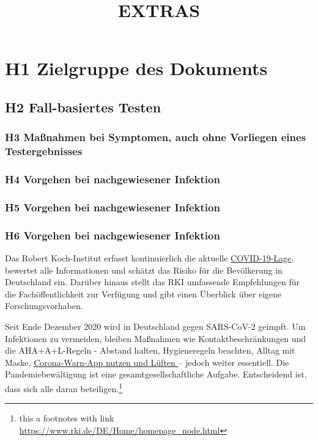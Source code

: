 \documentclass{article}
\begin{document}
\title{EXTRAS}

\maketitle


\section{H1 Zielgruppe des Dokuments}\label{H1720422}



\subsection{H2 Fall-basiertes Testen}\label{H2716720}



\subsubsection{H3 Maßnahmen bei Symptomen, auch ohne Vorliegen eines Testergebnisses}\label{H380543}



\subsubsection{H4 Vorgehen bei nachgewiesener Infektion}\label{H7768565}



\subsubsection{H5 Vorgehen bei nachgewiesener Infektion}\label{H9682083}



\subsubsection{H6 Vorgehen bei nachgewiesener Infektion}\label{H5952869}



Das Robert Koch-Institut erfasst kontinuierlich die aktuelle \hyperlink{F27326161}{COVID-19-Lage}, bewertet alle Informationen und schätzt das Risiko für die Bevölkerung in Deutschland ein. Darüber hinaus stellt das RKI umfassende Empfehlungen für die Fachöffentlichkeit zur Verfügung und gibt einen Überblick über eigene Forschungsvorhaben.



Seit Ende Dezember 2020 wird in Deutschland gegen SARS-CoV-2 geimpft. Um Infektionen zu vermeiden, bleiben Maßnahmen wie Kontaktbeschränkungen und die AHA+A+L-Regeln - Abstand halten, Hygieneregeln beachten, Alltag mit Maske, \href{https://www.rki.de/DE/Home/homepage_node.html}{Corona-Warn-App nutzen und Lüften }– jedoch weiter essentiell. Die Pandemiebewältigung ist eine gesamtgesellschaftliche Aufgabe. Entscheidend ist, dass sich alle daran beteiligen.\footnote{this a footnotes with link \href{https://www.rki.de/DE/Home/homepage_node.html}{https://www.rki.de/DE/Home/homepage\_node.html}}
\end{document}
